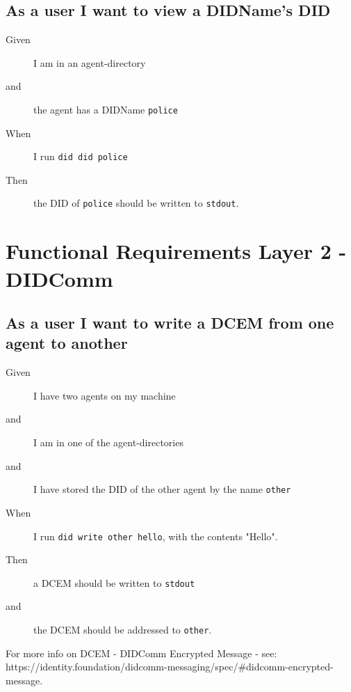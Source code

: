 \subsection{As a user I want to view a DIDName's DID}
\begin{description}\begin{description}
    \item[Given] I am in an agent-directory
    \item[and] the agent has a DIDName \texttt{police}
    \item[When] I run \texttt{did did police}
    \item[Then] the DID of \texttt{police} should be written to \texttt{stdout}.
\end{description}\end{description}


\newpage

\section{Functional Requirements Layer 2 - DIDComm}

\subsection{As a user I want to write a DCEM from one agent to another}
\begin{description}\begin{description}
    \item[Given] I have two agents on my machine
    \item[and] I am in one of the agent-directories
    \item[and] I have stored the DID of the other agent by the name \texttt{other}
    \item[When] I run \texttt{did write other hello}, with the contents "Hello".
    \item[Then] a DCEM should be written to \texttt{stdout}
    \item[and] the DCEM should be addressed to \texttt{other}. 
\end{description}\end{description}

For more info on DCEM - DIDComm Encrypted Message - see: https://identity.foundation/didcomm-messaging/spec/#didcomm-encrypted-message.




